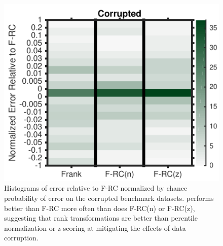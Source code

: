 \begin{figure}[h!]
\begin{center}
\centerline{\includegraphics[width=0.6\columnwidth]{ROFLMAO_figS2_benchmark_scaling_methods_2017_01_23}}
\caption{Histograms of error relative to F-RC normalized by chance probability of error on the corrupted benchmark datasets. \Frank performs better than F-RC more often than does F-RC(n) or F-RC(z), suggesting that rank transformations are better than perentile normalization or z-scoring at mitigating the effects of data corruption.}
\label{benchmark scaling}
\end{center}
\end{figure}


